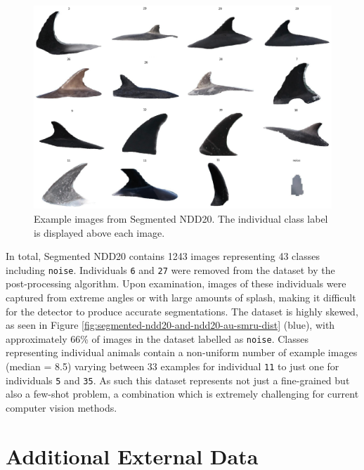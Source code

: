 \begin{figure}
	\begin{center}
		\includegraphics[scale=0.6]{Chapter4/figs/segmented-ndd20-tiled-updated.png}
	\end{center}
	\caption[Example images from Segmented NDD20.]{Example images from Segmented NDD20. The individual class label is displayed above each image.}
	\label{fig:segmented-ndd20-example}
\end{figure}

In total, Segmented NDD20 contains 1243 images representing 43 classes including \texttt{noise}. Individuals \texttt{6} and \texttt{27} were removed from the dataset by the post-processing algorithm. Upon examination, images of these individuals were captured from extreme angles or with large amounts of splash, making it difficult for the detector to produce accurate segmentations. The dataset is highly skewed, as seen in Figure \ref{fig:segmented-ndd20-and-ndd20-au-smru-dist} (blue), with approximately 66\% of images in the dataset labelled as \texttt{noise}. Classes representing individual animals contain a non-uniform number of example images (median = 8.5) varying between 33 examples for individual \texttt{11} to just one for individuals \texttt{5} and \texttt{35}. As such this dataset represents not just a fine-grained but also a few-shot problem, a combination which is extremely challenging for current computer vision methods. 

\section{Additional External Data}\label{ch:NDD,sec:NDD_AU_SMRU}

